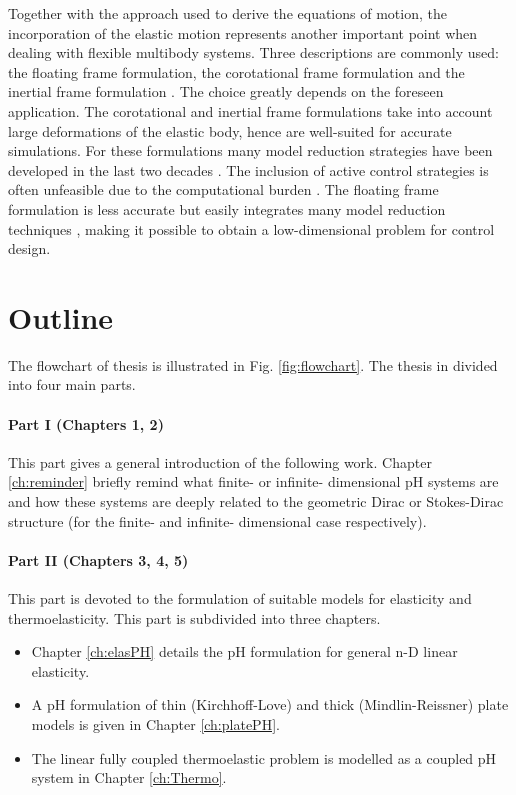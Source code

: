 \indent Together with the approach used to derive the equations of motion, the incorporation of the elastic motion represents another important point when dealing with flexible multibody systems. Three descriptions are commonly used: the floating frame formulation, the corotational frame formulation and the inertial frame formulation \cite{ellenbroek2018}. The choice greatly depends on the foreseen application.  The corotational and inertial frame formulations take into account large deformations of the elastic body, hence are well-suited for accurate simulations. For these formulations many model reduction strategies have been developed in the last two decades \cite{rong2019}. The inclusion of active control strategies is often unfeasible due to the computational burden \cite{wasfy2003survey}. The floating frame formulation is less accurate but easily integrates many model reduction techniques \cite{nowakowski2012}, making it possible to obtain a low-dimensional problem for control design. \\


\section{Outline}

The flowchart of thesis is illustrated in Fig. \ref{fig:flowchart}. The thesis in divided into four main parts.

\paragraph{Part I (Chapters 1, 2)}
This part gives a general introduction of the following work. Chapter \ref{ch:reminder} briefly remind what  finite- or infinite- dimensional pH systems are and how these systems are deeply related to the geometric Dirac  or Stokes-Dirac structure (for the finite- and infinite- dimensional case respectively).

\paragraph{Part II (Chapters 3, 4, 5)}
This part is devoted to the formulation of suitable models for elasticity and thermoelasticity. This part is subdivided into three chapters.
\begin{itemize}
\item Chapter \ref{ch:elasPH} details the pH formulation for general n-D linear elasticity.
\item A pH formulation of thin (Kirchhoff-Love) and thick (Mindlin-Reissner) plate models is given in Chapter \ref{ch:platePH}.
\item The linear fully coupled thermoelastic problem is modelled as a coupled pH system in Chapter \ref{ch:Thermo}. 
\end{itemize}


